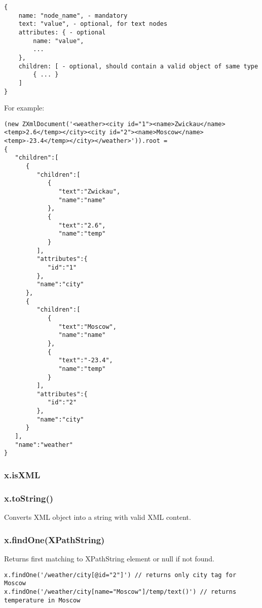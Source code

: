 \begin{lstlisting}
{
    name: "node_name", - mandatory
    text: "value", - optional, for text nodes
    attributes: { - optional
    	name: "value",
    	...
    },
    children: [ - optional, should contain a valid object of same type
    	{ ... }
    ]
}
\end{lstlisting}

For example:
\begin{lstlisting}
(new ZXmlDocument('<weather><city id="1"><name>Zwickau</name><temp>2.6</temp></city><city id="2"><name>Moscow</name><temp>-23.4</temp></city></weather>')).root =
{
   "children":[
      {
         "children":[
            {
               "text":"Zwickau",
               "name":"name"
            },
            {
               "text":"2.6",
               "name":"temp"
            }
         ],
         "attributes":{
            "id":"1"
         },
         "name":"city"
      },
      {
         "children":[
            {
               "text":"Moscow",
               "name":"name"
            },
            {
               "text":"-23.4",
               "name":"temp"
            }
         ],
         "attributes":{
            "id":"2"
         },
         "name":"city"
      }
   ],
   "name":"weather"
}
\end{lstlisting}

\subsubsection{x.isXML}

\subsubsection{x.toString()}
Converts XML object into a string with valid XML content.

\subsubsection{x.findOne(XPathString)}
Returns first matching to XPathString element or null if not found.
\begin{lstlisting}
x.findOne('/weather/city[@id="2"]') // returns only city tag for Moscow
x.findOne('/weather/city[name="Moscow"]/temp/text()') // returns temperature in Moscow
\end{lstlisting}

